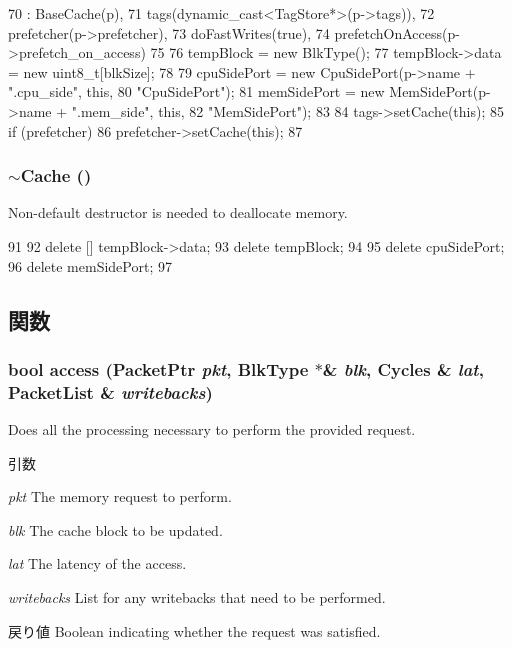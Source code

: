 \begin{DoxyCode}
70     : BaseCache(p),
71       tags(dynamic_cast<TagStore*>(p->tags)),
72       prefetcher(p->prefetcher),
73       doFastWrites(true),
74       prefetchOnAccess(p->prefetch_on_access)
75 {
76     tempBlock = new BlkType();
77     tempBlock->data = new uint8_t[blkSize];
78 
79     cpuSidePort = new CpuSidePort(p->name + ".cpu_side", this,
80                                   "CpuSidePort");
81     memSidePort = new MemSidePort(p->name + ".mem_side", this,
82                                   "MemSidePort");
83 
84     tags->setCache(this);
85     if (prefetcher)
86         prefetcher->setCache(this);
87 }
\end{DoxyCode}
\hypertarget{classCache_a899b8bf120ecc87b59e142f00b2987b0}{
\subsubsection[{$\sim$Cache}]{\setlength{\rightskip}{0pt plus 5cm}$\sim${\bf Cache} ()}}
\label{classCache_a899b8bf120ecc87b59e142f00b2987b0}
Non-\/default destructor is needed to deallocate memory. 


\begin{DoxyCode}
91 {
92     delete [] tempBlock->data;
93     delete tempBlock;
94 
95     delete cpuSidePort;
96     delete memSidePort;
97 }
\end{DoxyCode}


\subsection{関数}
\hypertarget{classCache_ae24e0e790eea2373d750eb6642007750}{
\subsubsection[{access}]{\setlength{\rightskip}{0pt plus 5cm}bool access ({\bf PacketPtr} {\em pkt}, \/  {\bf BlkType} $\ast$\& {\em blk}, \/  {\bf Cycles} \& {\em lat}, \/  {\bf PacketList} \& {\em writebacks})}}
\label{classCache_ae24e0e790eea2373d750eb6642007750}
Does all the processing necessary to perform the provided request. 
\begin{DoxyParams}{引数}
\item[{\em pkt}]The memory request to perform. \item[{\em blk}]The cache block to be updated. \item[{\em lat}]The latency of the access. \item[{\em writebacks}]List for any writebacks that need to be performed. \end{DoxyParams}
\begin{DoxyReturn}{戻り値}
Boolean indicating whether the request was satisfied. 
\end{DoxyReturn}



